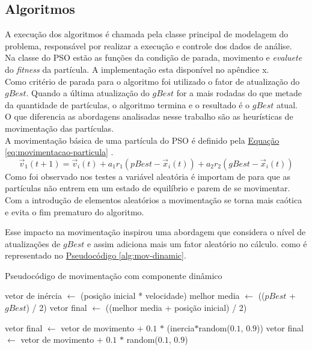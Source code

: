 \subsection{Algoritmos}
A execução dos algoritmos é chamada pela classe principal de modelagem do problema, responsável por realizar a execução e controle dos dados de análise.\\
%
Na classe do PSO estão as funções da condição de parada, movimento e \textit{evaluete} do \textit{fitness} da partícula. A implementação esta disponível no apêndice x.\\ %
%
%
Como critério de parada para o algoritmo foi utilizado o fator de atualização do $gBest$. Quando a última atualização do $gBest$ for a mais rodadas do que metade da quantidade de partículas, o algoritmo termina e o resultado é o $gBest$ atual.\\
\indent O que diferencia as abordagens analisadas nesse trabalho são as heurísticas de movimentação das partículas.\\
A movimentação básica de uma partícula do PSO é definido pela
\hyperref[eq:movimentacao-particula]{Equação \ref{eq:movimentacao-particula}}
.
%
\begin{equation} 
    \label{eq:movimentacao-particula}
    \vec v_1(t+1)= \vec v_i(t) + a_1 r_1 (pBest - \vec x_i(t)) + a_2 r_2 (gBest - \vec x_i(t))
\end{equation}
%
Como foi observado nos testes a variável aleatória é importam de para que as partículas não entrem em um estado de equilíbrio e parem de se movimentar. Com a introdução de elementos aleatórios a movimentação se torna mais caótica e evita o fim prematuro do algoritmo.

Esse impacto na movimentação inspirou uma abordagem que considera o nível de atualizações de $gBest$ e assim adiciona mais um fator aleatório no cálculo. como é representado no 
\hyperref[alg:mov-dinamic]{Pseudocódigo \ref{alg:mov-dinamic}}.
\begin{algorithm}
    \caption{Pseudocódigo de movimentação com componente dinâmico}\label{alg:mov-dinamic}
\begin{algorithmic}

\State vetor de inércia $\gets$ (posição inicial * velocidade)
\State melhor media $\gets$ (($pBest$ + $gBest$) / 2)
\State vetor final $\gets$ ((melhor media + posição inicial) / 2)

    \State vetor final $\gets$ vetor de movimento $+$ $0.1$ $*$ (inercia$*$random($0.1$, $0.9$))
\Else
    \State vetor final $\gets$ vetor de movimento $+$ $0.1$ $*$ random($0.1$, $0.9$) 
\EndIf    
\end{algorithmic}
\end{algorithm}

